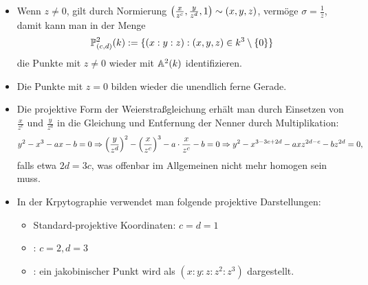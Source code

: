 \begin{bem}
	\begin{itemize}
		\item Wenn $z \neq 0$, gilt durch Normierung $\left(\frac{x}{z^c}, \frac{y}{z^d},1\right) \sim (x,y,z)$, vermöge $\sigma = \frac{1}{z}$, damit kann man in der Menge
		\[
			\mathbb{P}_{(c,d)}^2(k) := \{ (x:y:z) : (x,y,z) \in k^3 \setminus \{0\} \}
		\]
		die Punkte mit $z \neq 0$ wieder mit $\mathbb{A}^2(k)$ identifizieren.
		\item Die Punkte mit $z = 0$ bilden wieder die unendlich ferne Gerade.
		\item Die projektive Form der Weierstraßgleichung erhält man durch Einsetzen von $\frac{x}{z^c}$ und $\frac{y}{z^d}$ in die Gleichung und Entfernung der Nenner durch Multiplikation:
		\[
			y^2 - x^3 - ax - b = 0 \Rightarrow \left(\frac{y}{z^d}\right)^2 - \left(\frac{x}{z^c}\right)^3 - a \cdot \frac{x}{z^c} - b = 0 \Rightarrow y^2 - x^{3-3c+2d} - axz^{2d-c} - bz^{2d} = 0,
		\]
		falls etwa $2d = 3c$, was offenbar im Allgemeinen nicht mehr homogen sein muss.
		\newpage
		\item In der Krpytographie verwendet man folgende projektive Darstellungen:
			\begin{itemize}
				\item Standard-projektive Koordinaten: $c=d=1$
				\item {}: $c=2, d=3$
				\item {}: ein jakobinischer Punkt wird als $(x:y:z:z^2:z^3)$ dargestellt.
			\end{itemize}
	\end{itemize}
\end{bem}

